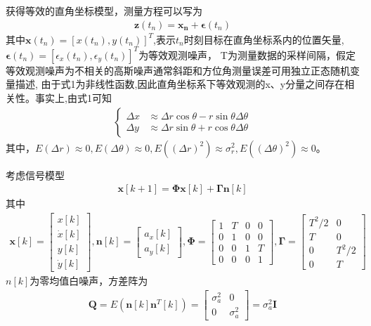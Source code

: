 \documentclass[fontset=windows]{article}
\numberwithin{figure}{section}
\begin{document}
获得等效的直角坐标模型，测量方程可以写为
\begin{align*}
    \mathbf{z}(t_n)=\mathbf{x_n}+\boldsymbol{\epsilon}(t_n)
\end{align*}
其中\(\mathbf{x}(t_n)=[x(t_n),y(t_n)]^T\),表示\(t_n\)时刻目标在直角坐标系内的位置矢量,
\(\boldsymbol{\epsilon}(t_n)=[\epsilon_x (t_n),\epsilon_y (t_n)]^T\)为等效观测噪声，
T为测量数据的采样间隔，假定等效观测噪声为不相关的高斯噪声通常斜距和方位角测量误差可用独立正态随机变量描述,
由于式1为非线性函数,因此直角坐标系下等效观测的x、y分量之间存在相关性。事实上,由式1可知
\begin{align}
    \left\{
    \begin{matrix}
        \Delta x & \approx \Delta r \cos \theta-r \sin\theta \Delta \theta \\
        \Delta y & \approx \Delta r \sin\theta+r \cos\theta \Delta \theta
    \end{matrix}
    \right.
\end{align}
其中，\(E(\Delta r)\approx 0,E(\Delta \theta)\approx 0,E((\Delta r)^2)\approx \sigma^2_r,
E((\Delta \theta)^2)\approx 0\)。

考虑信号模型
\begin{align*}
    \mathbf{x}[k+1]=\boldsymbol{\Phi}\mathbf{x}[k]+\boldsymbol{\Gamma}\mathbf{n}[k]
\end{align*}
其中
\begin{align*}
    \mathbf{x}[k]=
    \begin{bmatrix}
        x[k]       \\
        \dot{x}[k] \\
        y[k]       \\
        \dot{y}[k]
    \end{bmatrix},
    \mathbf{n}[k]=
    \begin{bmatrix}
        a_x[k] \\
        a_y[k]
    \end{bmatrix},
    \boldsymbol{\Phi}=
    \begin{bmatrix}
        1 & T & 0 & 0 \\
        0 & 1 & 0 & 0 \\
        0 & 0 & 1 & T \\
        0 & 0 & 0 & 1
    \end{bmatrix},
    \boldsymbol{\Gamma}=
    \begin{bmatrix}
        T^2/2 & 0     \\
        T     & 0     \\
        0     & T^2/2 \\
        0     & T
    \end{bmatrix}
\end{align*}
\(n[k]\)为零均值白噪声，方差阵为
\begin{align*}
    \mathbf{Q}=E\left(\mathbf{n}[k]\mathbf{n}^T[k]\right)
    =\begin{bmatrix}
        \sigma^2_a & 0          \\
        0          & \sigma^2_a
    \end{bmatrix}=\sigma^2_a\mathbf{I}
\end{align*}
\end{document}
